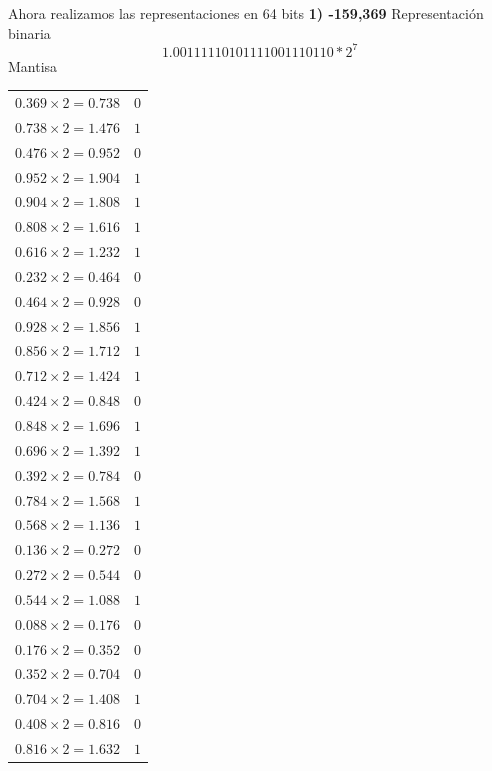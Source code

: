 \documentclass[12pt]{article}
\begin{document}
Ahora realizamos las representaciones en 64 bits
\newline\newline
\large{\textbf{1) -159,369}}
\normalsize
\newline Representación binaria
$$1.00111110101111001110110*2^7$$
Mantisa
\begin{center}
    \begin{tabular}{|c|c|}
        \hline
        $0.369 \times 2 = 0.738$ & $0$\\
        $0.738 \times 2 = 1.476$ & $1$\\
        $0.476 \times 2 = 0.952$ & $0$\\
        $0.952 \times 2 = 1.904$ & $1$\\
        $0.904 \times 2 = 1.808$ & $1$\\
        $0.808 \times 2 = 1.616$ & $1$\\
        $0.616 \times 2 = 1.232$ & $1$\\
        $0.232 \times 2 = 0.464$ & $0$\\
        $0.464 \times 2 = 0.928$ & $0$\\
        $0.928 \times 2 = 1.856$ & $1$\\
        $0.856\times 2 = 1.712$ & $1$\\
        $0.712 \times 2 = 1.424$ & $1$\\
        $0.424\times 2 = 0.848$ & $0$\\
        $0.848 \times 2 = 1.696$ & $1$\\
        $0.696 \times 2 = 1.392$ & $1$\\
        $0.392 \times 2 = 0.784$ & $0$\\ %
        $0.784 \times 2 = 1.568$ & $1$\\
        $0.568 \times 2 = 1.136$ & $1$\\
        $0.136 \times 2 = 0.272$ & $0$\\
        $0.272 \times 2 = 0.544$ & $0$\\
        $0.544 \times 2 = 1.088$ & $1$\\
        $0.088 \times 2 = 0.176$ & $0$\\
        $0.176 \times 2 = 0.352$ & $0$\\
        $0.352 \times 2 = 0.704$ & $0$\\
        $0.704 \times 2 = 1.408$ & $1$\\
        $0.408 \times 2 = 0.816$ & $0$\\
        $0.816\times 2 = 1.632$ & $1$\\

\end{tabular}
\end{center}
\end{document}
